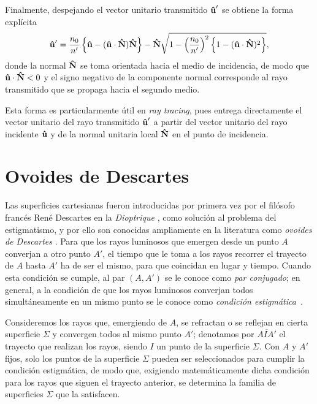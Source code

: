 Finalmente, despejando el vector unitario transmitido $\bm{\hat{\mathbf{u}}}'$ se obtiene la forma explícita
%
\begin{equation}
  \bm{\hat{\mathbf{u}}}'
  =
  \frac{n_0}{n'}
  \left\{
    \bm{\hat{\mathbf{u}}} - (\bm{\hat{\mathbf{u}}}\cdot\bm{\hat{\mathbf{N}}})\bm{\hat{\mathbf{N}}}
  \right\}
  -
  \bm{\hat{\mathbf{N}}}
  \sqrt{
    1 - \left(\frac{n_0}{n'}\right)^2
    \left\{
      1 - (\bm{\hat{\mathbf{u}}}\cdot\bm{\hat{\mathbf{N}}})^2
    \right\}
  },
  \label{eq:vectorial_law_of_snell_descartes}
\end{equation}
%
donde la normal $\bm{\hat{\mathbf{N}}}$ se toma orientada hacia el medio de incidencia, de modo que $\bm{\hat{\mathbf{u}}}\cdot\bm{\hat{\mathbf{N}}}<0$ y el signo negativo de la componente normal corresponde al rayo transmitido que se propaga hacia el segundo medio.

Esta forma es particularmente útil en \emph{ray tracing}, pues entrega directamente el vector unitario del rayo transmitido $\bm{\hat{\mathbf{u}}}'$ a partir del vector unitario del rayo incidente $\bm{\hat{\mathbf{u}}}$ y de la normal unitaria local $\bm{\hat{\mathbf{N}}}$ en el punto de incidencia.



\section{Ovoides de Descartes} 

Las superficies cartesianas fueron introducidas por primera vez por el filósofo francés René Descartes en la \emph{Dioptrique} \cite{dioptrique}, como solución al problema del estigmatismo, y por ello son conocidas ampliamente en la literatura como \emph{ovoides de Descartes} \cite{ovoids2023}. Para que los rayos luminosos que emergen desde un punto $A$ converjan a otro punto $A'$, el tiempo que le toma a los rayos recorrer el trayecto de $A$ hasta $A'$ ha de ser el mismo, para que coincidan en lugar y tiempo. Cuando esta condición se cumple, al par $(A, A')$ se le conoce como \emph{par conjugado}; en general, a la condición de que los rayos luminosos converjan todos simultáneamente en un mismo punto se le conoce como \emph{condición estigmática}~\cite{bornwolf1999}.

Consideremos los rayos que, emergiendo de $A$, se refractan o se reflejan en cierta superficie $\Sigma$ y convergen todos al mismo punto $A'$; denotamos por $\overline{AIA'}$ el trayecto que realizan los rayos, siendo $I$ un punto de la superficie $\Sigma$. Con $A$ y $A'$ fijos, solo los puntos de la superficie $\Sigma$ pueden ser seleccionados para cumplir la condición estigmática, de modo que, exigiendo matemáticamente dicha condición para los rayos que siguen el trayecto anterior, se determina la familia de superficies $\Sigma$ que la satisfacen.

